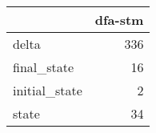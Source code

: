 \begin{tabular}{lr}
\toprule
{} &  dfa-stm \\
\midrule
delta         &      336 \\
final\_state   &       16 \\
initial\_state &        2 \\
state         &       34 \\
\bottomrule
\end{tabular}
